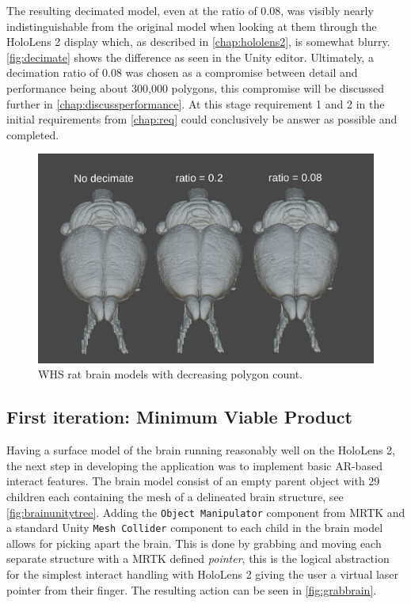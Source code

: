 The resulting decimated model, even at the ratio of 0.08, was visibly nearly indistinguishable from the original model when looking at them through the HoloLens 2 display which, as described in \autoref{chap:hololens2}, is somewhat blurry. \autoref{fig:decimate} shows the difference as seen in the Unity editor. Ultimately, a decimation ratio of 0.08 was chosen as a compromise between detail and performance being about 300,000 polygons, this compromise will be discussed further in \autoref{chap:discussperformance}. At this stage requirement 1 and 2 in the initial requirements from \autoref{chap:req} could conclusively be answer as possible and completed.
\begin{figure}[ht]
    \includegraphics[width=\textwidth]{fig/brainmodeldecimateratio2.png}
    \caption{WHS rat brain models with decreasing polygon count.}
    \label{fig:decimate}
\end{figure}



\subsection[Iteration 1]{First iteration: Minimum Viable Product}\label{chap:itr1}

Having a surface model of the brain running reasonably well on the HoloLens 2, the next step in developing the application was to implement basic AR-based interact features. The brain model consist of an empty parent object with 29 children each containing the mesh of a delineated brain structure, see \autoref{fig:brainunitytree}. Adding the \texttt{Object Manipulator} component from MRTK and a standard Unity \texttt{Mesh Collider} component to each child in the brain model allows for picking apart the brain. This is done by grabbing and moving each separate structure with a MRTK defined \textit{pointer}, this is the logical abstraction for the simplest interact handling with HoloLens 2 giving the user a virtual laser pointer from their finger. The resulting action can be seen in \autoref{fig:grabbrain}. 

